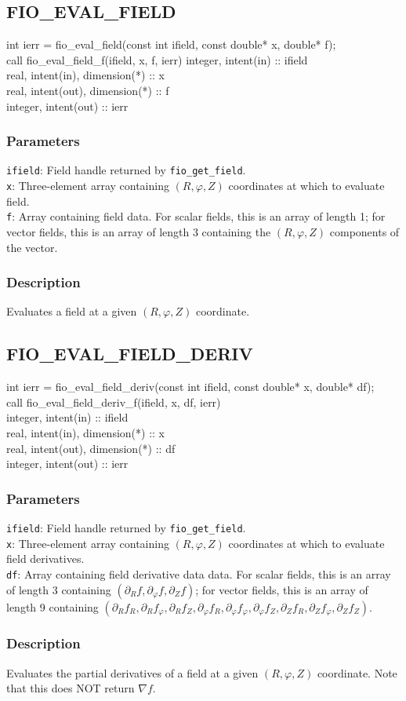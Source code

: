 \documentclass{article}
\newcommand{\parameter}[2]{\noindent \texttt{#1}: #2}
\newcommand{\function}[4]{
  \subsection{\uppercase{#1}}

  #2

  \subsubsection{Parameters}
  #3

  \subsubsection{Description}
  #4
}
\begin{document}
\function{fio\_eval\_field}{
\noindent
int ierr = fio\_eval\_field(const int ifield, const double* x, double* f);\\

\noindent
call fio\_eval\_field\_f(ifield, x, f, ierr)
integer, intent(in) :: ifield\\
real, intent(in), dimension(*) :: x\\
real, intent(out), dimension(*) :: f\\
integer, intent(out) :: ierr
}
{
\parameter{ifield}{Field handle returned by \texttt{fio\_get\_field}.}\\
\parameter{x}{Three-element array containing $(R, \varphi, Z)$ coordinates at which to evaluate field.}\\
\parameter{f}{Array containing field data.  For scalar fields, this is an array of length 1; for vector fields, this is an array of length 3 containing the $(R, \varphi, Z)$ components of the vector.}
}
{
Evaluates a field at a given $(R, \varphi, Z)$ coordinate.
}

\function{fio\_eval\_field\_deriv}{
\noindent
int ierr = fio\_eval\_field\_deriv(const int ifield, const double* x,
double* df);\\

\noindent
call fio\_eval\_field\_deriv\_f(ifield, x, df, ierr)\\
integer, intent(in) :: ifield\\
real, intent(in), dimension(*) :: x\\
real, intent(out), dimension(*) :: df\\
integer, intent(out) :: ierr
}
{
\parameter{ifield}{Field handle returned by \texttt{fio\_get\_field}.}\\
\parameter{x}{Three-element array containing $(R, \varphi, Z)$
  coordinates at which to evaluate field derivatives.}\\
\parameter{df}{Array containing field derivative data data.  For scalar
  fields, this is an array of length 3 containing $(\partial_R f,
  \partial_\varphi f, \partial_Z f)$; for vector fields, this is an
  array of length 9 containing $(\partial_R f_R, \partial_R
  f_\varphi, \partial_R f_Z, 
  \partial_\varphi f_R, \partial_\varphi f_\varphi, \partial_\varphi f_Z,
  \partial_Z f_R, \partial_Z f_\varphi, \partial_Z f_Z)$.}
}
{
  Evaluates the partial derivatives of a field at a given $(R,
  \varphi, Z)$ coordinate.  Note that this does NOT return $\nabla f$.
}
\end{document}
